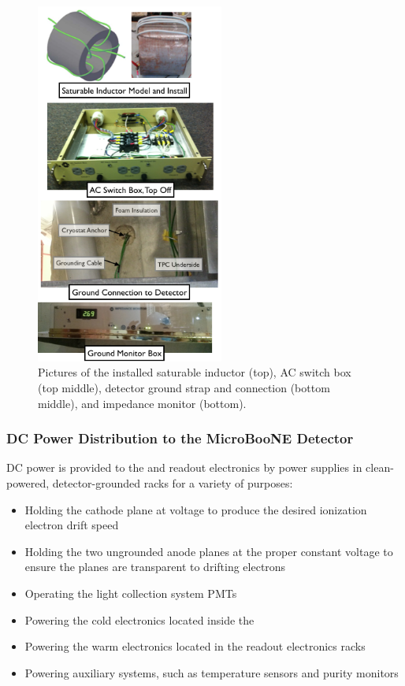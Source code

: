 \begin{figure}[htb!pb]
\centering
\includegraphics[width=0.55\textwidth]{./figures/PowerDiagPic2.png}
\caption[]{Pictures of the installed saturable inductor (top), AC switch box (top middle), detector ground strap and connection (bottom middle), and impedance monitor (bottom).}
\label{fig:ElecInfAC2}
\end{figure}



\subsubsection{DC Power Distribution to the MicroBooNE Detector}
DC power is provided to the \lartpc and readout electronics by power supplies in clean-powered, detector-grounded racks for a variety of purposes:
\begin{itemize}
\item{Holding the \lartpc cathode plane at voltage to produce the desired ionization electron drift speed}
\item{Holding the two ungrounded anode planes at the proper constant voltage to ensure the planes are transparent to drifting electrons}
\item{Operating the light collection system PMTs}
\item{Powering the cold electronics located inside the \lartpc}
\item{Powering the warm electronics located in the \lartpc readout electronics racks}
\item{Powering auxiliary systems, such as \lartpc temperature sensors and purity monitors}
\end{itemize}

